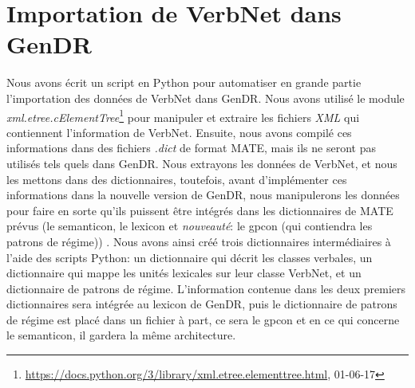 
\chapter{Importation de VerbNet dans GenDR}\label{ch:python}

Nous avons écrit un script en Python pour automatiser en grande partie l'importation des données de VerbNet dans GenDR. Nous avons utilisé le module \emph{xml.etree.cElementTree}\footnote{\url{https://docs.python.org/3/library/xml.etree.elementtree.html}, 01-06-17} pour manipuler et extraire les fichiers \emph{XML} qui contiennent l'information de VerbNet. Ensuite, nous avons compilé ces informations dans des fichiers \emph{.dict} de format MATE, mais ils ne seront pas utilisés tels quels dans GenDR. Nous extrayons les données de VerbNet, et nous les mettons dans des dictionnaires, toutefois, avant d'implémenter ces informations dans la nouvelle version de GenDR, nous manipulerons les données pour faire en sorte qu'ils puissent être intégrés dans les dictionnaires de MATE prévus (le semanticon, le lexicon et \emph{nouveauté}: le gpcon (qui contiendra les patrons de régime)) . Nous avons ainsi créé trois dictionnaires intermédiaires à l'aide des scripts Python: un dictionnaire qui décrit les classes verbales, un dictionnaire qui mappe les unités lexicales sur leur classe VerbNet, et un dictionnaire de patrons de régime. L'information contenue dans les deux premiers dictionnaires sera intégrée au lexicon de GenDR, puis le dictionnaire de patrons de régime est placé dans un fichier à part, ce sera le gpcon et en ce qui concerne le semanticon, il gardera la même architecture.



